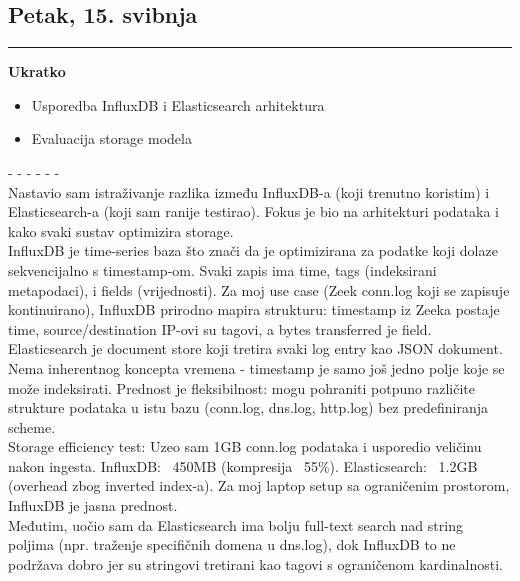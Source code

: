 \documentclass[12pt, a4paper]{article}
\newcommand{\dan}[1]{
    \subsection*{#1}
    \vspace{-0.5em} 
    \hrule \vspace{0.5em} 
}
\begin{document}
\dan{Petak, 15. svibnja}
\textbf{Ukratko}
\begin{itemize}
    \item Usporedba InfluxDB i Elasticsearch arhitektura
    \item Evaluacija storage modela
\end{itemize}
- - - - - - \\
Nastavio sam istraživanje razlika između InfluxDB-a (koji trenutno koristim) i Elasticsearch-a (koji sam ranije testirao). Fokus je bio na arhitekturi podataka i kako svaki sustav optimizira storage.
\\
InfluxDB je time-series baza što znači da je optimizirana za podatke koji dolaze sekvencijalno s timestamp-om. Svaki zapis ima time, tags (indeksirani metapodaci), i fields (vrijednosti). Za moj use case (Zeek conn.log koji se zapisuje kontinuirano), InfluxDB prirodno mapira strukturu: timestamp iz Zeeka postaje time, source/destination IP-ovi su tagovi, a bytes transferred je field.
\\
Elasticsearch je document store koji tretira svaki log entry kao JSON dokument. Nema inherentnog koncepta vremena - timestamp je samo još jedno polje koje se može indeksirati. Prednost je fleksibilnost: mogu pohraniti potpuno različite strukture podataka u istu bazu (conn.log, dns.log, http.log) bez predefiniranja scheme.
\\
Storage efficiency test: Uzeo sam 1GB conn.log podataka i usporedio veličinu nakon ingesta. InfluxDB: ~450MB (kompresija ~55\%). Elasticsearch: ~1.2GB (overhead zbog inverted index-a). Za moj laptop setup sa ograničenim prostorom, InfluxDB je jasna prednost.
\\
Međutim, uočio sam da Elasticsearch ima bolju full-text search nad string poljima (npr. traženje specifičnih domena u dns.log), dok InfluxDB to ne podržava dobro jer su stringovi tretirani kao tagovi s ograničenom kardinalnosti.
\end{document}
